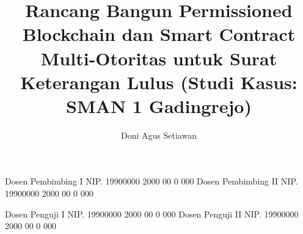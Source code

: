 \documentclass[article]{report} %
\begin{document}
    
    \title{Rancang Bangun Permissioned Blockchain dan Smart Contract Multi-Otoritas untuk Surat Keterangan Lulus (Studi Kasus: SMAN 1 Gadingrejo)}
    
	\author{Doni Agus Setiawan}		%
	
	\dosbingA%
		{Dosen Pembimbing I}%
		{NIP. 19900000 2000 00 0 000}	%
	\dosbingB%
		{Dosen Pembimbing II}%
		{NIP. 19900000 2000 00 0 000}	%
		
	\pengujiA%
		{Dosen Penguji I}%
		{NIP. 19900000 2000 00 0 000}	%
	\pengujiB%
		{Dosen Penguji II}%
		{NIP. 19900000 2000 00 0 000}	%

	\sloppy %
    \setcounter{page}{1} %
\end{document}
